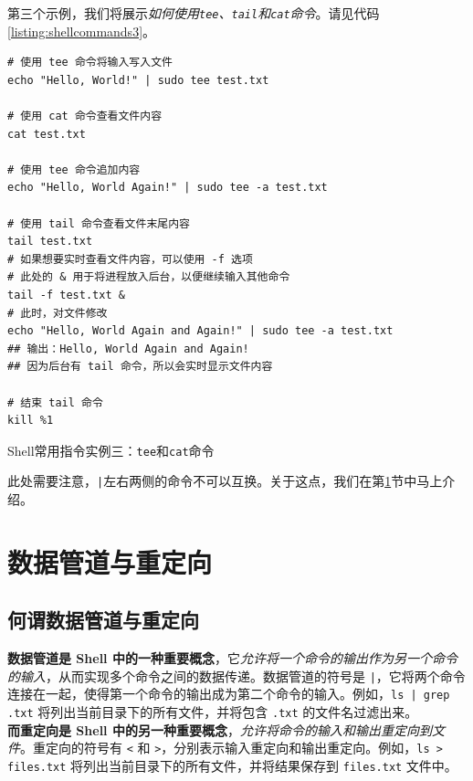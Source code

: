 第三个示例，我们将展示\textit{如何使用\texttt{tee}、\texttt{tail}和\texttt{cat}命令}。请见代码\ref{listing:shellcommands3}。

\begin{longlisting}
    \begin{verbatim}
# 使用 tee 命令将输入写入文件
echo "Hello, World!" | sudo tee test.txt

# 使用 cat 命令查看文件内容
cat test.txt

# 使用 tee 命令追加内容
echo "Hello, World Again!" | sudo tee -a test.txt

# 使用 tail 命令查看文件末尾内容
tail test.txt
# 如果想要实时查看文件内容，可以使用 -f 选项
# 此处的 & 用于将进程放入后台，以便继续输入其他命令
tail -f test.txt &
# 此时，对文件修改
echo "Hello, World Again and Again!" | sudo tee -a test.txt
## 输出：Hello, World Again and Again!
## 因为后台有 tail 命令，所以会实时显示文件内容

# 结束 tail 命令
kill %1
    \end{verbatim}
    \caption{Shell常用指令实例三：\texttt{tee}和\texttt{cat}命令}
    \label{listing:shellcommands3}
\end{longlisting}

此处需要注意，\texttt{|}左右两侧的命令不可以互换。关于这点，我们在第\ref{cp:piperedirection}节中马上介绍。

\section{数据管道与重定向}

\label{cp:piperedirection}

\subsection{何谓数据管道与重定向}

\textbf{数据管道是 Shell 中的一种重要概念}，它\textit{允许将一个命令的输出作为另一个命令的输入}，从而实现多个命令之间的数据传递。数据管道的符号是 \texttt{|}，它将两个命令连接在一起，使得第一个命令的输出成为第二个命令的输入。例如，\texttt{ls | grep .txt} 将列出当前目录下的所有文件，并将包含 \texttt{.txt} 的文件名过滤出来。\\

\textbf{而重定向是 Shell 中的另一种重要概念}，\textit{允许将命令的输入和输出重定向到文件}。重定向的符号有 \texttt{<} 和 \texttt{>}，分别表示输入重定向和输出重定向。例如，\texttt{ls > files.txt} 将列出当前目录下的所有文件，并将结果保存到 \texttt{files.txt} 文件中。

